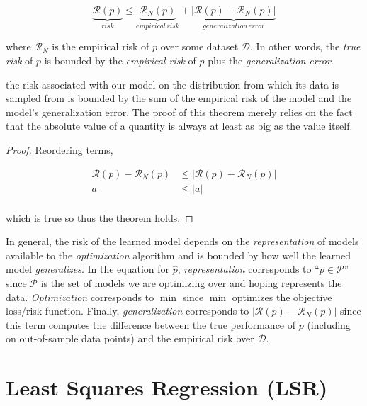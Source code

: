 \begin{thm} 
    $$\underbrace{\mathcal{R}(p)}_{risk} \leq \underbrace{\mathcal{R}_{N}(p)}_{empirical\,risk}+\underbrace{\left|\mathcal{R}(p)-\mathcal{R}_{N}(p)\right|}_{generalization\,error}$$

where $\mathcal{R}_{N}$ is the empirical risk of $p$ over some dataset $\mathcal{D}$. In other words, the \textit{true risk} of $p$ is bounded by the \textit{empirical risk} of $p$ plus the \textit{generalization error}.
\end{thm}

the risk associated with our model on the distribution from which its data is sampled from is bounded by the sum of the empirical risk of the model and the model's generalization error. The proof of this theorem merely relies on the fact that the absolute value of a quantity is always at least as big as the value itself. 



\begin{proof}
Reordering terms,

\begin{align*}
\mathcal{R}(p) - \mathcal{R}_{N}(p) &\le |\mathcal{R}(p) - \mathcal{R}_{N}(p)| \\
a &\le |a|\\
\end{align*}

which is true so thus the theorem holds.
\end{proof}

In general, the risk of the learned model depends on the \textit{representation} of models available to the \textit{optimization} algorithm and is bounded by how well the learned model \textit{generalizes}. In the equation for $\hat{p}$, \textit{representation} corresponds to ``$p \in \mathcal{P}$'' since $\mathcal{P}$ is the set of models we are optimizing over and hoping represents the data. \textit{Optimization} corresponds to $\min$ since $\min$ optimizes the objective loss/risk function. Finally, \textit{generalization} corresponds to $|\mathcal{R}(p) - \mathcal{R}_N(p)|$ since this term computes the difference between the true performance of $p$ (including on out-of-sample data points) and the empirical risk over $\mathcal{D}$.

\section{Least Squares Regression (LSR)}

